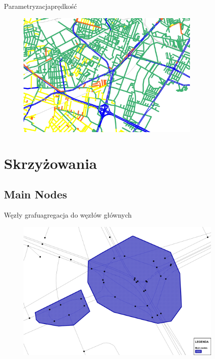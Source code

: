 \documentclass[8pt]{beamer}
\begin{document}
\begin{frame}{Parametryzacja}{prędkość}
\begin{figure}\begin{center}
\includegraphics[width=0.8\textwidth]{speed_map}
 \end{center}  \end{figure} 
\end{frame}


\section{Skrzyżowania}
\subsection{Main Nodes}

\begin{frame}{Węzły grafu}{agregacja do węzłów głównych}
\begin{figure}\begin{center}
\includegraphics[width=0.9\textwidth]{aggr_node}
 \end{center}  \end{figure} 
\end{frame}
\end{document}
